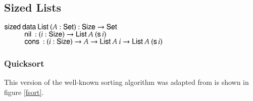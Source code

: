 \clearpage

\subsection{Sized Lists}
\begin{bsp}
$\mathsf{sized}\: \mathsf{data}\: \mathsf{List}\: ( A : \mathsf{Set} ) : \mathsf{Size} \rightarrow \mathsf{Set} $ \\
$\spcx \nil : \EPi{i}{\Size}{ \SList A \: (\s i)} $\\
$\spcx \cons : \EPi{i}{\Size}{ A \ra \SList A \: i \ra \SList A \: (\s i)} $
\end{bsp}

\subsubsection{Quicksort}
This version of the well-known sorting algorithm was adapted from \cite{abel:rairo04} is shown in figure \ref{fsort}.

